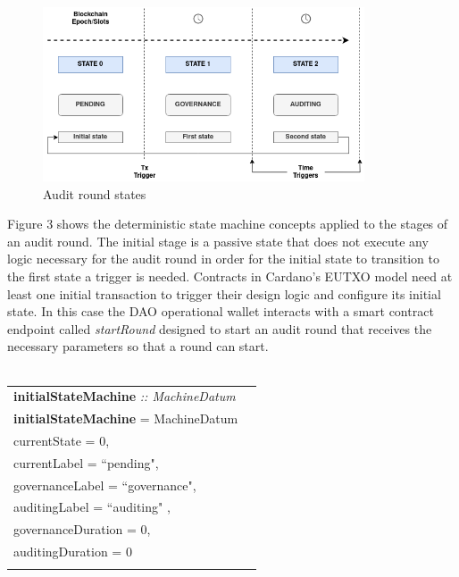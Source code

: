 \documentclass[9pt]{article}
\begin{document}
\begin{figure}[ht]
  \centering
  \includegraphics[width=0.85\textwidth]{machine.png}
  \caption{Audit round states}
  \label{fig:Audit round states}
\end{figure}

Figure 3 shows the deterministic state machine concepts applied to the stages of an audit round. The initial stage is a passive state that does not execute any logic necessary for the audit round in order for the initial state to transition to the first state a trigger is needed. Contracts in Cardano's EUTXO model need at least one initial transaction to trigger their design logic and configure its initial state. In this case the DAO operational wallet interacts with a smart contract endpoint called \emph{startRound}  designed to start an audit round that receives the necessary parameters so that a round can start. 
\\
\\
\begin{tabular}{lr}
\textbf{initialStateMachine} \emph{:: MachineDatum}\\
\textbf{initialStateMachine}  = MachineDatum  \textbraceleft{}
\\ \hspace{60mm}currentState = 0, 
\\ \hspace{60mm}currentLabel = ``pending",
\\ \hspace{60mm}governanceLabel = ``governance",
\\ \hspace{60mm}auditingLabel = ``auditing" ,
\\ \hspace{60mm}governanceDuration = 0,
\\ \hspace{60mm}auditingDuration = 0
\\\hspace{60mm}\textbraceright{} 
\end{tabular}
\\
\\
\end{document}
